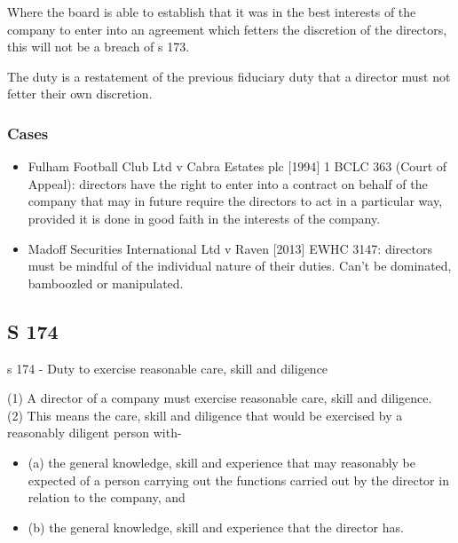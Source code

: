 \documentclass[
]{article}
\providecommand{\tightlist}{%
  \setlength{\itemsep}{0pt}\setlength{\parskip}{0pt}}
\newenvironment{env-136e818f-6bd8-45c9-b7d8-e6b8925f9e62}
{
    \savenotes\tcolorbox[blanker,breakable,left=5pt,borderline west={2pt}{-4pt}{green}]
}
{
    \endtcolorbox\spewnotes
}
\begin{document}
Where the board is able to establish that it was in the best interests
of the company to enter into an agreement which fetters the discretion
of the directors, this will not be a breach of s 173.

The duty is a restatement of the previous fiduciary duty that a director
must not fetter their own discretion.

\hypertarget{cases}{%
\subsubsection{Cases}\label{cases}}

\begin{itemize}
\tightlist
\item
  Fulham Football Club Ltd v Cabra Estates plc {[}1994{]} 1 BCLC 363
  (Court of Appeal): directors have the right to enter into a contract
  on behalf of the company that may in future require the directors to
  act in a particular way, provided it is done in good faith in the
  interests of the company.
\item
  Madoff Securities International Ltd v Raven {[}2013{]} EWHC 3147:
  directors must be mindful of the individual nature of their duties.
  Can't be dominated, bamboozled or manipulated.
\end{itemize}

\hypertarget{s-174}{%
\subsection{S 174}\label{s-174}}

\begin{env-136e818f-6bd8-45c9-b7d8-e6b8925f9e62}

s 174 - Duty to exercise reasonable care, skill and diligence

(1) A director of a company must exercise reasonable care, skill and
diligence.\\
(2) This means the care, skill and diligence that would be exercised by
a reasonably diligent person with-

\begin{itemize}
\tightlist
\item
  (a) the general knowledge, skill and experience that may reasonably be
  expected of a person carrying out the functions carried out by the
  director in relation to the company, and
\item
  (b) the general knowledge, skill and experience that the director has.
\end{itemize}

\end{env-136e818f-6bd8-45c9-b7d8-e6b8925f9e62}
\end{document}
